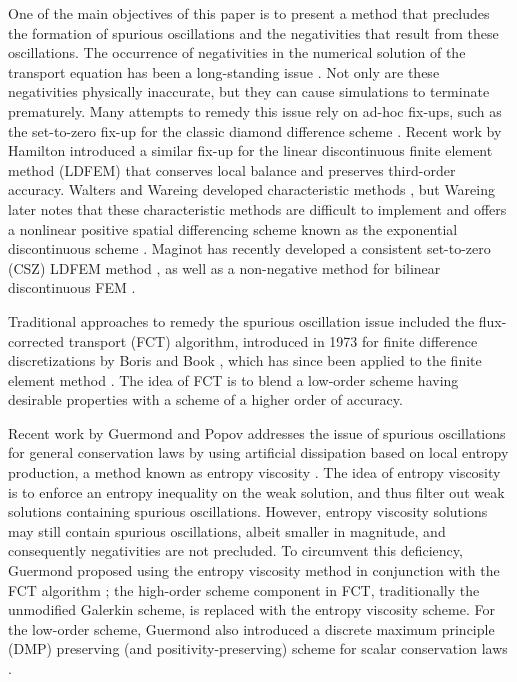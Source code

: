 One of the main objectives of this paper is to present a method that precludes
the formation of spurious oscillations and the negativities that result from
these oscillations. The occurrence of negativities in the numerical solution of
the transport equation has been a long-standing issue \cite{lanthrop}.
Not only are these negativities physically inaccurate, but they can cause
simulations to terminate prematurely. Many attempts to remedy this
issue rely on ad-hoc fix-ups, such as the set-to-zero fix-up for the
classic diamond difference scheme \cite{lewis}. Recent work by Hamilton
introduced a similar fix-up for the linear discontinuous finite element
method (LDFEM) that conserves local balance and preserves third-order accuracy.
Walters and Wareing developed characteristic methods \cite{walters_NC}, but
Wareing later notes that these characteristic methods are difficult to
implement and offers a nonlinear positive spatial differencing scheme
known as the exponential discontinuous scheme \cite{wareing}.
Maginot has recently developed a consistent set-to-zero (CSZ) LDFEM
method \cite{maginot}, as well as a non-negative method for bilinear
discontinuous FEM \cite{maginot_mc2015}.

Traditional approaches to remedy the spurious oscillation issue included
the flux-corrected transport (FCT) algorithm, introduced in 1973 for finite
difference discretizations
by Boris and Book \cite{borisbook}, which has since been applied to the finite
element method \cite{kuzmin_FCT}. The idea of FCT is to blend a low-order scheme
having desirable properties with a scheme of a higher order of accuracy.

Recent work by Guermond and Popov addresses the issue of spurious oscillations
for general conservation laws by using artificial dissipation based on
local entropy production, a method known as entropy viscosity \cite{guermond_ev}.
The idea of entropy viscosity is to enforce an entropy inequality on the weak solution,
and thus filter out weak solutions containing spurious oscillations. However,
entropy viscosity solutions may still contain spurious
oscillations, albeit smaller in magnitude, and consequently negativities
are not precluded. To circumvent this deficiency, Guermond proposed using
the entropy viscosity method in conjunction with the FCT
algorithm \cite{guermond_secondorder}; the high-order scheme component in FCT,
traditionally the unmodified Galerkin scheme, is replaced with the entropy
viscosity scheme.
For the low-order
scheme, Guermond also introduced
a discrete maximum principle (DMP) preserving (and positivity-preserving)
scheme for scalar
conservation laws \cite{guermond_firstorder}.

